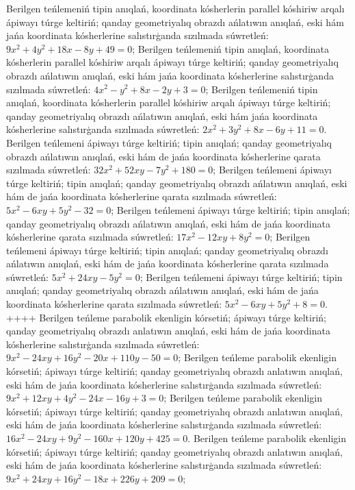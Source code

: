 Berilgen teńlemeniń tipin anıqlań, koordinata kósherlerin parallel kóshiriw arqalı ápiwayı túrge keltiriń; qanday geometriyalıq obrazdı ańlatıwın anıqlań, eski hám jańa koordinata kósherlerine salıstırģanda sızılmada súwretleń:  $9 x^2+4 y^2+18 x-8 y+49=0$;
Berilgen teńlemeniń tipin anıqlań, koordinata kósherlerin parallel kóshiriw arqalı ápiwayı túrge keltiriń; qanday geometriyalıq obrazdı ańlatıwın anıqlań, eski hám jańa koordinata kósherlerine salıstırģanda sızılmada súwretleń: $4 x^2-y^2+8 x-2 y+3=0$;
Berilgen teńlemeniń tipin anıqlań, koordinata kósherlerin parallel kóshiriw arqalı ápiwayı túrge keltiriń; qanday geometriyalıq obrazdı ańlatıwın anıqlań, eski hám jańa koordinata kósherlerine salıstırģanda sızılmada súwretleń: $2 x^2+3 y^2+8 x-6 y+11=0$.
Berilgen teńlemeni ápiwayı túrge keltiriń; tipin anıqlań; qanday geometriyalıq obrazdı ańlatıwın anıqlań, eski hám de jańa koordinata kósherlerine qarata sızılmada súwretleń: $32 x^2+52 x y-7 y^2+180=0$;
Berilgen teńlemeni ápiwayı túrge keltiriń; tipin anıqlań; qanday geometriyalıq obrazdı ańlatıwın anıqlań, eski hám de jańa koordinata kósherlerine qarata sızılmada súwretleń: $5 x^2-6 x y+5 y^2-32=0$;
Berilgen teńlemeni ápiwayı túrge keltiriń; tipin anıqlań; qanday geometriyalıq obrazdı ańlatıwın anıqlań, eski hám de jańa koordinata kósherlerine qarata sızılmada súwretleń: $17 x^2-12 x y+8 y^2=0$;
Berilgen teńlemeni ápiwayı túrge keltiriń; tipin anıqlań; qanday geometriyalıq obrazdı ańlatıwın anıqlań, eski hám de jańa koordinata kósherlerine qarata sızılmada súwretleń:  $5 x^2+24 x y-5 y^2=0$;
Berilgen teńlemeni ápiwayı túrge keltiriń; tipin anıqlań; qanday geometriyalıq obrazdı ańlatıwın anıqlań, eski hám de jańa koordinata kósherlerine qarata sızılmada súwretleń: $5 x^2-6 x y+5 y^2+8=0$.
++++
Berilgen teńleme parabolik ekenligin kórsetiń; ápiwayı túrge keltiriń; qanday geometriyalıq obrazdı anlatıwın anıqlań, eski hám de jańa koordinata kósherlerine salıstırģanda sızılmada súwretleń:$9 x^2-24 x y+16 y^2-20 x+110 y-50=0$;
Berilgen teńleme parabolik ekenligin kórsetiń; ápiwayı túrge keltiriń; qanday geometriyalıq obrazdı anlatıwın anıqlań, eski hám de jańa koordinata kósherlerine salıstırģanda sızılmada súwretleń:$9 x^2+12 x y+4 y^2-24 x-16 y+3=0$;
Berilgen teńleme parabolik ekenligin kórsetiń; ápiwayı túrge keltiriń; qanday geometriyalıq obrazdı anlatıwın anıqlań, eski hám de jańa koordinata kósherlerine salıstırģanda sızılmada súwretleń:$16 x^2-24 x y+9 y^2-160 x+120 y+425=0$.
Berilgen teńleme parabolik ekenligin kórsetiń; ápiwayı túrge keltiriń; qanday geometriyalıq obrazdı anlatıwın anıqlań, eski hám de jańa koordinata kósherlerine salıstırģanda sızılmada súwretleń: $9 x^2+24 x y+16 y^2-18 x+226 y+209=0$;
